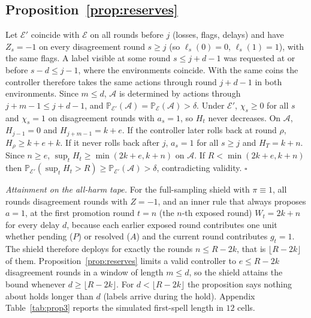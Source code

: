 \documentclass{article}
\theoremstyle{plain}
\theoremstyle{definition}
\newcommand{\PP}{\mathbb{P}}
\begin{document}
\subsection{Proposition~\ref{prop:reserves}}
Let $\mathcal E'$ coincide with $\mathcal E$ on all rounds before $j$ (losses, flags, delays) and have $Z_s=-1$ on every disagreement round $s\ge j$ (so $\ell_s(0)=0$, $\ell_s(1)=1$), with the same flags. A label visible at some round $s\le j+d-1$ was requested at or before $s-d\le j-1$, where the environments coincide. With the same coins the controller therefore takes the same actions through round $j+d-1$ in both environments. Since $m\le d$, $\mathcal A$ is determined by actions through $j+m-1\le j+d-1$, and $\PP_{\mathcal E'}(\mathcal A)=\PP_{\mathcal E}(\mathcal A)>\delta$. Under $\mathcal E'$, $\chi_s\ge0$ for all $s$ and $\chi_s=1$ on disagreement rounds with $a_s=1$, so $H_t$ never decreases. On $\mathcal A$, $H_{j-1}=0$ and $H_{j+m-1}=k+e$. If the controller later rolls back at round $\rho$, $H_\rho\ge k+e+k$. If it never rolls back after $j$, $a_s=1$ for all $s\ge j$ and $H_T=k+n$. Since $n\ge e$, $\sup_tH_t\ge\min(2k+e,k+n)$ on $\mathcal A$. If $R<\min(2k+e,k+n)$ then $\PP_{\mathcal E'}(\sup_tH_t>R)\ge\PP_{\mathcal E'}(\mathcal A)>\delta$, contradicting validity. $\square$

\emph{Attainment on the all-harm tape.} For the full-sampling shield with $\pi\equiv1$, all rounds disagreement rounds with $Z=-1$, and an inner rule that always proposes $a=1$, at the first promotion round $t=n$ (the $n$-th exposed round) $W_t=2k+n$ for every delay $d$, because each earlier exposed round contributes one unit whether pending ($P$) or resolved ($A$) and the current round contributes $g_t=1$. The shield therefore deploys for exactly the rounds $n\le R-2k$, that is $\lfloor R-2k\rfloor$ of them. Proposition~\ref{prop:reserves} limits a valid controller to $e\le R-2k$ disagreement rounds in a window of length $m\le d$, so the shield attains the bound whenever $d\ge\lfloor R-2k\rfloor$. For $d<\lfloor R-2k\rfloor$ the proposition says nothing about holds longer than $d$ (labels arrive during the hold). Appendix Table~\ref{tab:prop3} reports the simulated first-spell length in $12$ cells.
\end{document}
